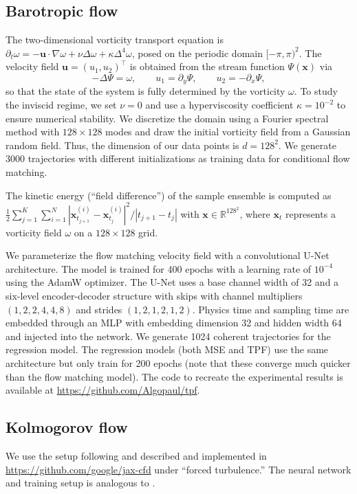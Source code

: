 \documentclass{article}
\newcommand{\bfx}{\boldsymbol{x}}
\theoremstyle{definition}
\theoremstyle{plain}
\theoremstyle{definition}
\theoremstyle{remark}
\begin{document}
\subsection{Barotropic flow}\label{appendix:barotropic}
The two-dimensional vorticity transport equation is 
$\partial_t \omega
= - \boldsymbol{u}\cdot\nabla \omega
+ \nu \Delta \omega
+ \kappa \Delta^{4}\omega$, 
posed on the periodic domain $[-\pi,\pi)^2$.
The velocity field $\boldsymbol{u}=(u_1,u_2)^\top$ is obtained from the stream function $\Psi(\boldsymbol{x})$ via
\[
-\Delta \Psi = \omega, 
\qquad
u_1 = \partial_y \Psi, 
\qquad
u_2 = -\partial_x \Psi ,
\]
so that the state of the system is fully determined by the vorticity $\omega$. To study the inviscid regime, we set $\nu=0$ and use a hyperviscosity coefficient $\kappa=10^{-2}$ to ensure numerical stability. We discretize the domain using a Fourier spectral method with $128\times128$ modes and draw the initial vorticity field from a Gaussian random field. Thus, the dimension of our data points is $d = 128^2$. We generate 3000 trajectories with different initializations as training data for conditional flow matching.

The kinetic energy (``field difference'') of the sample ensemble is computed as $\frac{1}{2} \sum_{j=1}^K \sum_{i = 1}^N |\bfx_{t_{j+1}}^{(i)} - \bfx_{t_j}^{(i)}|^2 / |t_{j+1} - t_j|$ with $\bfx \in \mathbb R^{128^2}$, where $\bfx_t$ represents a vorticity field $\omega$ on a $128\times 128$ grid.

We parameterize the flow matching velocity field with a convolutional U-Net architecture. 
The model is trained for 400 epochs with a learning rate of \(10^{-4}\) using the AdamW optimizer. 
The U-Net uses a base channel width of 32 and a six-level encoder-decoder structure with skips with channel multipliers \((1,2,2,4,4,8)\) and strides \((1,2,1,2,1,2)\). 
Physics time and sampling time are embedded through an MLP with embedding dimension 32 and hidden width 64 and injected into the network. We generate 1024 coherent trajectories for the regression model. The regression models (both MSE and TPF) use the same architecture but only train for 200 epochs (note that these converge much quicker than the flow matching model). The code to recreate the experimental results is available at \url{https://github.com/Algopaul/tpf}.

\subsection{Kolmogorov flow}\label{appendix:KolmogorovFlow}
We use the setup following  \cite{doi:10.1073/pnas.2101784118} and described and implemented in \url{https://github.com/google/jax-cfd} under ``forced turbulence.'' The neural network and training setup is analogous to . 
\end{document}
